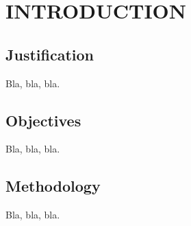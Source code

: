 \section{INTRODUCTION} \label{sec:introduction}

\subsection{Justification}

Bla, bla, bla.
    
\subsection{Objectives}

Bla, bla, bla.

\subsection{Methodology}

Bla, bla, bla.
